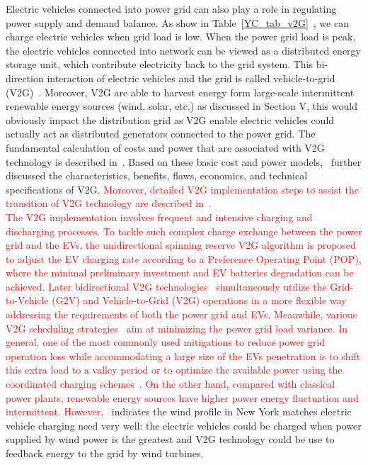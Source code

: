 Electric vehicles connected into power grid can also play a role in regulating power supply and demand balance. 
As show in Table~\ref{YC_tab_v2G}~\cite{YC_Green,YC_Acha}, we can charge electric vehicles when grid load is low. 
When the power grid load is peak, the electric vehicles connected into network can be viewed as a distributed energy storage unit, which contribute electricity back to the grid system. 
This bi-direction interaction of electric vehicles and the grid is called vehicle-to-grid (V2G)~\cite{YC_V2Gconcept1,YC_V2Gconcept2}.
Moreover, V2G are able to harvest energy form large-scale intermittent renewable energy sources (wind, solar, etc.) as discussed in Section V, this would obviously impact the distribution grid as V2G enable electric vehicles could actually act as distributed generators connected to the power grid.
The fundamental calculation of costs and power that are associated with V2G technology is described in~\cite{YC_V2Gconcept1}. 
Based on these basic cost and power models,~\cite{YC_Reid,YC_Sutanto,YC_Brooks} further discussed the characteristics, benefits, flaws, economics, and technical specifications of V2G. \textcolor{red}{Moreover, detailed V2G implementation steps to assist the transition of V2G technology are described in~\cite{YC_V2Gconcept2}.\\
%
%
The V2G implementation involves frequent and intensive charging and discharging processes. To tackle such complex charge exchange between the power grid and the EVs, the unidirectional spinning reserve V2G algorithm is proposed~\cite{YC_Sortomme_2} to adjust the EV charging rate according to a Preference Operating Point (POP), where the minimal preliminary investment and EV batteries degradation can be achieved.  Later bidirectional V2G technologies~\cite{YC_Shafie-khah,YC_Nguyen,YC_Xie} simultaneously utilize the Grid-to-Vehicle (G2V) and Vehicle-to-Grid (V2G) operations in a more flexible way addressing the requirements of both the power grid and EVs. Meanwhile, various V2G scheduling strategies~\cite{YC_Sortomme,YC_Jian_2,YC_Kordkheili} aim at minimizing the power grid load variance. In general, one of the most commonly used mitigations to reduce power grid operation loss while accommodating a large size of the EVs penetration is to shift this extra load to a valley period or to optimize the available power using the coordinated charging schemes~\cite{YC_Fernandez}. On the other hand, 
compared with classical power plants, renewable energy sources have higher power energy fluctuation and intermittent. However,}~\cite{YC_newyork} indicates the wind profile in New York matches electric vehicle charging need very well: the electric vehicles could be charged when power supplied by wind power is the greatest and V2G technology could be use to feedback energy to the grid by wind turbines.
